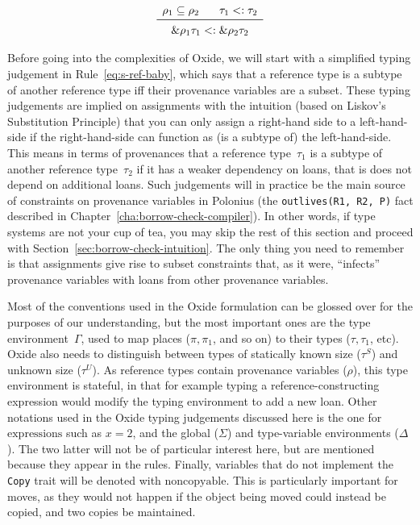 \documentclass[11pt,a4paper,twoside,openany]{report}
\newcommand{\InRust}[1]{\texttt{#1}}
\newcommand{\InDatalog}[1]{\texttt{#1}}
\newcommand{\expression}[1]{\boxed{#1}}
\newcommand{\ntyperule}[2]{\begin{array}{c}#1\\\midrule\raisebox{1pt}{\strut}#2\end{array}}
\newcommand{\decoline}{%
   \par
   \vspace{\baselineskip}
   \hfill
   \ding{100}
   \hfill
   \vspace{\baselineskip}
\par}
\renewcommand\_{\textunderscore\allowbreak}
\begin{document}
\begin{equation}\label{eq:s-ref-baby}
  \ntyperule{
    \rho_1 \subseteq \rho_2 \:\:\:\:\:\:\:\:
    \tau_1 <: \tau_2
  }%
  {
    \&\rho_1 \tau_1 <: \&\rho_2 \tau_2
  }
\end{equation}

Before going into the complexities of Oxide, we will start with a simplified
typing judgement in Rule~\eqref{eq:s-ref-baby}, which says that a reference type
is a subtype of another reference type iff their provenance variables are a
subset. These typing judgements are implied on assignments with the intuition
(based on Liskov's Substitution Principle) that you can only assign a right-hand
side to a left-hand-side if the right-hand-side can function as (is a subtype
of) the left-hand-side. This means in terms of provenances that a reference
type~$\tau_1$ is a subtype of another reference type~$\tau_2$ if it has a weaker
dependency on loans, that is does not depend on additional loans. Such
judgements will in practice be the main source of constraints on provenance
variables in Polonius (the \InDatalog{outlives(R1, R2, P)} fact described in
Chapter~\ref{cha:borrow-check-compiler}). In other words, if type systems are
not your cup of tea, you may skip the rest of this section and proceed with
Section~\ref{sec:borrow-check-intuition}. The only thing you need to remember is
that assignments give rise to subset constraints that, as it were, ``infects''
provenance variables with loans from other provenance variables.

\decoline{}

Most of the conventions used in the Oxide formulation can be glossed over for
the purposes of our understanding, but the most important ones are the type
environment~$\Gamma$, used to map places ($\pi, \pi_1$, and so on) to their
types ($\tau, \tau_1$, etc). Oxide also needs to distinguish between types of
statically known size ($\tau^S$) and unknown size ($\tau^U$). As reference types
contain provenance variables ($\rho$), this type environment is stateful, in
that for example typing a reference-constructing expression would modify the
typing environment to add a new loan. Other notations used in the Oxide typing
judgements discussed here is the one for $\expression{\text{expressions}}$ such
as $\expression{x = 2}$, and the global ($\Sigma$) and type-variable
environments ($\Delta$). The two latter will not be of particular interest here,
but are mentioned because they appear in the rules. Finally, variables that do
not implement the \InRust{Copy} trait will be denoted with $\text{noncopyable}$.
This is particularly important for moves, as they would not happen if the object
being moved could instead be copied, and two copies be maintained.
\end{document}

